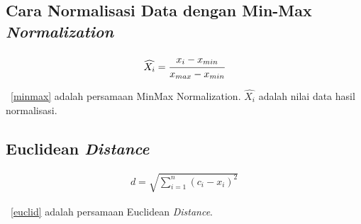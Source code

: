 %
%
%
%


\chapter{\babTiga}


\section{Cara Normalisasi Data dengan Min-Max \textit{Normalization}}

\noindent \begin{align}\label{minmax}
	\widehat{X_{i}} = \cfrac{x_{i} - x_{min}}{x_{max} - x_{min}}
\end{align}

\equ~\ref{minmax} adalah persamaan MinMax Normalization. $\widehat{X_{i}}$ adalah nilai data hasil normalisasi.

\section{Euclidean \textit{Distance}}
\noindent \begin{align}\label{euclid}
	d = \sqrt{\sum_{i=1}^{n} (c_{i}-x_{i})^{2}}
\end{align}

\equ~\ref{euclid} adalah persamaan Euclidean \textit{Distance}.